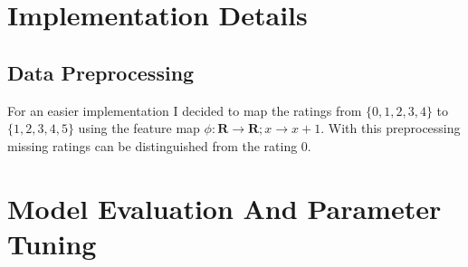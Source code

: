 \documentclass[]{scrartcl}
\begin{document}
\section{Implementation Details}

\subsection{Data Preprocessing}
For an easier implementation I decided to map the ratings from $\{0,1,2,3,4\}$ to $\{1,2,3,4,5\}$ using the feature map $\phi:\mathbf{R}\rightarrow\mathbf{R};x\rightarrow x + 1$. With this preprocessing missing ratings can be distinguished from the rating 0.



\section{Model Evaluation And Parameter Tuning}

{}

\end{document}
